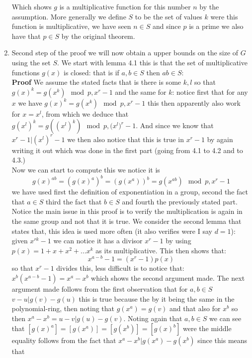 \begin{enumerate}
\begin{equation}
\end{equation}
Which shows $g$ is a multiplicative function for this number $n$ by the assumption. More generally we define $S$ to be the set of values $k$ were this function is multiplicative, we have seen $n\in S$ and since $p$ is a prime we also have that $p\in S$ by the original theorem.
\item Second step of the proof we will now obtain a upper bounds on the size of $G$ using the set $S$. We start with lemma 4.1 this is that the set of multiplicative functions $g(x)$ is closed: that is if $a,b\in S$ then $ab\in S$:\\
\textbf{Proof} We assume the stated facts that is there is some $k,l$ so that $g(x)^k=g(x^k)\mod{p,x^r-1}$ and the same for $k$: notice first that for any $x$ we have $g(x)^k=g(x^k)\mod{p,x^r-1}$ this then apparently also work for $x=x^l$, from which we deduce that $g(x^l)^k=g((x^l)^k)\mod{p,(x^{l}})^r-1$. And since we know that $x^r-1|(x^l)^r-1$ we then also notice that this is true in $x^r-1$ by again writing it out which was done in the first part (going from 4.1 to 4.2 and to 4.3.)\\
Now we can start to compute this we notice it is 
\begin{equation}
    g(x)^{ab}=(g(x)^a)^b=(g(x^a))^b=g(x^{ab})\mod{p,x^r-1}
\end{equation}
we have used first the definition of exponentiation in a group, second the fact that $a\in S$ third the fact that $b\in S$ and fourth the previously stated part. Notice the main issue in this proof is to verify the multiplication is again in the same group and not that it is true. 
We consider the second lemma that states that, this idea is used more often (it also verifies were I say $d=1$): 
given $x^{rk}-1$ we can notice it has a divisor $x^r-1$ by using $p(x)=1+x+x^2+...x^k$ as its multiplicative. This then shows that:
\begin{equation}
        x^{a-b}-1=(x^r-1)p(x)
\end{equation}
so that $x^r-1$ divides this, less difficult is to notice that: $x^b(x^{a-b}-1)=x^a-x^b$ which shows the second argument made. The next argument made follows from the first observation that for $a,b\in S$ $v-u|g(v)-g(u)$ this is true because the by it being the same in the polynomial-ring, then noting that $g(x^a)=g(v)$ and that also for $x^b$ so then $x^a-x^b=u-v|g(u)-g(v)$. Noting again that $a,b\in S$ we can see that $[g(x)^a]=[g(x^a)]=[g(x^b)]=[g(x)^b]$ were the middle equality follows from the fact that $x^a-x^b|g(x^a)-g(x^b)$ since this means that 

\end{enumerate}
